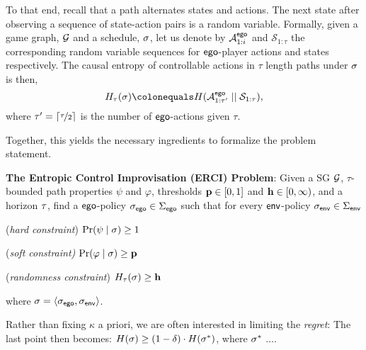 {{{To that end, recall that a path alternates states and actions.  The
next state after observing a sequence of state-action pairs is a
random variable. Formally, given a game graph, $\mathcal{G}$ and a schedule,
$\sigma$, let us denote by $\mathcal{A}^{\mathsf{ego}}_{1:i}$ and
$\mathcal{S}_{1:\tau}$ the corresponding random variable sequences for
$\mathsf{ego}$-player actions and states respectively.  The causal entropy of
controllable actions in $\tau$ length paths under $\sigma$ is then,
\begin{equation}
   H_\tau(\sigma) \colonequals H( \mathcal{A}^{\pOne}_{1:\tau'} \mid\mid \mathcal{S}_{1:\tau} ),
\end{equation}
where $\tau' = \lceil \nicefrac{\tau}{2}\rceil$ is the number of $\mathsf{ego}$-actions given $\tau$.



\begin{example}
	
\end{example}

Together, this yields the necessary ingredients to formalize the problem statement. 
\begin{mdframed}[backgroundcolor=blue!5]
\textbf{The Entropic Control Improvisation (ERCI) Problem}:
Given a SG $\mathcal{G}$, $\tau$-bounded path properties $\psi$ and $\varphi$, thresholds $\mathbf{p} \in [0,1]$ and $\mathbf{h} \in [0,\infty)$, and a horizon $\tau$,  find a $\mathsf{ego}$-policy ${\sigma_{\mathsf{ego}}} \in \Sigma_{\mathsf{ego}}$  such that for every $\mathsf{env}$-policy ${\sigma_{\mathsf{env}}} \in \Sigma_{\mathsf{env}}$ \begin{compactenum}
	\item (\emph{hard constraint}) $\Pr(\psi \mid \sigma) \geq 1$
	\item (\emph{soft constraint)} $\Pr(\varphi \mid \sigma) \geq \mathbf{p}$
\item (\emph{randomness constraint}) $H_\tau(\sigma) \geq \mathbf{h}$
\end{compactenum}
where  $\sigma = \langle {\sigma_{\mathsf{ego}}}, {\sigma_{\mathsf{env}}} \rangle$.
\end{mdframed}
Rather than fixing $\kappa$ a priori, we are often interested in limiting the \emph{regret}: The last point then becomes:
$H(\sigma) \geq (1-\delta) \cdot H(\sigma^{*})$, where $\sigma^{*}$ ....  

}}}
